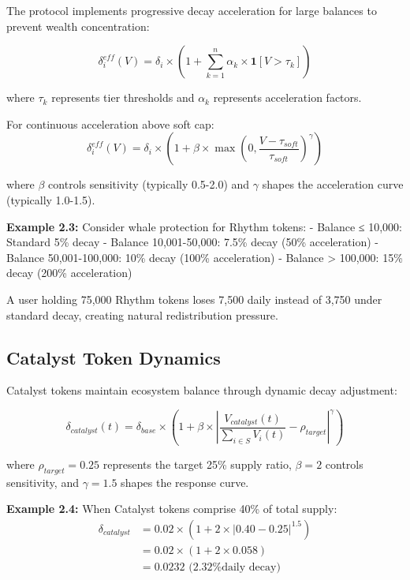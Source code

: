 \documentclass[11pt,letterpaper]{article}
\begin{document}
The protocol implements progressive decay acceleration for large balances to prevent wealth concentration:

\begin{equation}
\delta_i^{eff}(V) = \delta_i \times \left(1 + \sum_{k=1}^{n} \alpha_k \times \mathbf{1}[V > \tau_k]\right)
\end{equation}

where $\tau_k$ represents tier thresholds and $\alpha_k$ represents acceleration factors.

For continuous acceleration above soft cap:
\begin{equation}
\delta_i^{eff}(V) = \delta_i \times \left(1 + \beta \times \max\left(0, \frac{V - \tau_{soft}}{\tau_{soft}}\right)^{\gamma}\right)
\end{equation}

where $\beta$ controls sensitivity (typically 0.5-2.0) and $\gamma$ shapes the acceleration curve (typically 1.0-1.5).

\textbf{Example 2.3:} Consider whale protection for Rhythm tokens:
- Balance ≤ 10,000: Standard 5\% decay
- Balance 10,001-50,000: 7.5\% decay (50\% acceleration)
- Balance 50,001-100,000: 10\% decay (100\% acceleration)
- Balance > 100,000: 15\% decay (200\% acceleration)

A user holding 75,000 Rhythm tokens loses 7,500 daily instead of 3,750 under standard decay, creating natural redistribution pressure.

\subsection{Catalyst Token Dynamics}

Catalyst tokens maintain ecosystem balance through dynamic decay adjustment:

\begin{equation}
\delta_{catalyst}(t) = \delta_{base} \times \left(1 + \beta \times \left|\frac{V_{catalyst}(t)}{\sum_{i \in S} V_i(t)} - \rho_{target}\right|^{\gamma}\right)
\end{equation}

where $\rho_{target} = 0.25$ represents the target 25\% supply ratio, $\beta = 2$ controls sensitivity, and $\gamma = 1.5$ shapes the response curve.

\textbf{Example 2.4:} When Catalyst tokens comprise 40\% of total supply:
\begin{align}
\delta_{catalyst} &= 0.02 \times \left(1 + 2 \times |0.40 - 0.25|^{1.5}\right) \\
&= 0.02 \times (1 + 2 \times 0.058) \\
&= 0.0232 \text{ (2.32\% daily decay)}
\end{align}
\end{document}
